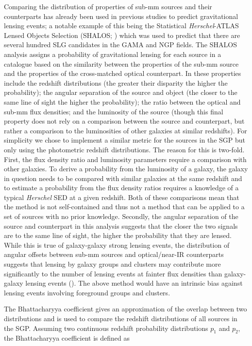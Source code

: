 Comparing the distribution of properties of sub-mm sources and their counterparts has already been used in previous studies to predict gravitational lensing events; a notable example of this being the Statistical \textit{Herschel}-ATLAS Lensed Objects Selection (SHALOS; \citealt{Gonzalez-Nuevo_2019}) which was used to predict that there are several hundred SLG candidates in the GAMA and NGP fields. The SHALOS analysis assigns a probability of gravitational lensing for each source in a catalogue based on the similarity between the properties of the sub-mm source and the properties of the cross-matched optical counterpart. In \citealt{Gonzalez-Nuevo_2019} these properties include the redshift distributions (the greater their disparity the higher the probability); the angular separation of the source and object (the closer to the same line of sight the higher the probability); the ratio between the optical and sub-mm flux densities; and the luminosity of the source (though this final property does not rely on a comparison between the source and counterpart, but rather a comparison to the luminosities of other galaxies at similar redshifts). For simplicity we chose to implement a similar metric for the sources in the SGP but only using the photometric redshift distributions. The reason for this is two-fold. First, the flux density ratio and luminosity parameters require a comparison with other galaxies. To derive a probability from the luminosity of a galaxy, the galaxy in question needs to be compared with similar galaxies at the same redshift and to estimate a probability from the flux density ratios requires a knowledge of a typical \textit{Herschel} SED at a given redshift. Both of these comparisons mean that the method is not self-contained and thus not a method that can be applied to a set of sources with no prior knowledge. Secondly, the angular separation of the source and counterpart in this analysis suggests that the closer the two signals are to the same line of sight, the higher the probability that they are lensed. While this is true of galaxy-galaxy strong lensing events, the distribution of angular offsets between sub-mm sources and optical/near-IR counterparts suggests that lensing by galaxy groups and clusters may contribute more significantly to the number of lensing events at fainter flux densities than galaxy-galaxy lensing events (\citealt{Bakx_2020}). The above method would have an intrinsic bias against lensing events involving foreground groups and clusters.

The Bhattacharyya coefficient gives an approximation of the overlap between two distributions and is used to compare the redshift distributions of all sources in the SGP. Assuming two continuous redshift probability distributions $p_1$ and $p_2$, the Bhattacharyya coefficient is defined as

